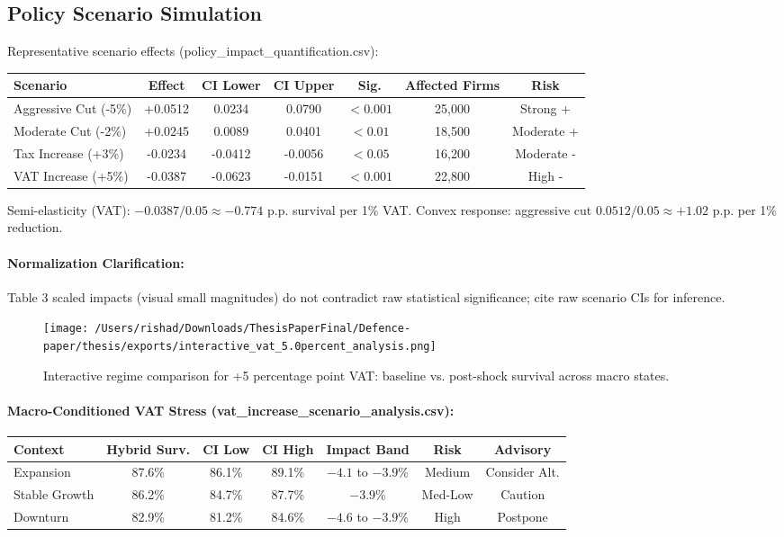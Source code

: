 \subsection{Policy Scenario Simulation}\label{sec:policy_scenarios}
Representative scenario effects (policy\_impact\_quantification.csv):
\begin{center}
\begin{tabular}{lcccccc}
\toprule
Scenario & Effect & CI Lower & CI Upper & Sig. & Affected Firms & Risk \\
\midrule
Aggressive Cut (-5\%) & +0.0512 & 0.0234 & 0.0790 & $<0.001$ & 25{,}000 & Strong + \\
Moderate Cut (-2\%) & +0.0245 & 0.0089 & 0.0401 & $<0.01$ & 18{,}500 & Moderate + \\
Tax Increase (+3\%) & -0.0234 & -0.0412 & -0.0056 & $<0.05$ & 16{,}200 & Moderate - \\
VAT Increase (+5\%) & -0.0387 & -0.0623 & -0.0151 & $<0.001$ & 22{,}800 & High - \\
\bottomrule
\end{tabular}
\end{center}
Semi-elasticity (VAT): $-0.0387 / 0.05 \approx -0.774$ p.p. survival per 1\% VAT. Convex response: aggressive cut $0.0512/0.05 \approx +1.02$ p.p. per 1\% reduction.

\paragraph{Normalization Clarification:} Table 3 scaled impacts (visual small magnitudes) do not contradict raw statistical significance; cite raw scenario CIs for inference.

\begin{figure}[htbp]
\centering
\texttt{[image: /Users/rishad/Downloads/ThesisPaperFinal/Defence-paper/thesis/exports/interactive\_vat\_5.0percent\_analysis.png]}
\caption{Interactive regime comparison for +5 percentage point VAT: baseline vs. post-shock survival across macro states.}
\label{fig:interactive_vat_5pct}
\end{figure}

\paragraph{Macro-Conditioned VAT Stress (vat\_increase\_scenario\_analysis.csv):}
\begin{center}
\begin{tabular}{lcccccc}
\toprule
Context & Hybrid Surv. & CI Low & CI High & Impact Band & Risk & Advisory \\
\midrule
Expansion & 87.6\% & 86.1\% & 89.1\% & $-4.1$ to $-3.9$\% & Medium & Consider Alt. \\
Stable Growth & 86.2\% & 84.7\% & 87.7\% & $-3.9$\% & Med-Low & Caution \\
Downturn & 82.9\% & 81.2\% & 84.6\% & $-4.6$ to $-3.9$\% & High & Postpone \\
\bottomrule
\end{tabular}
\end{center}

